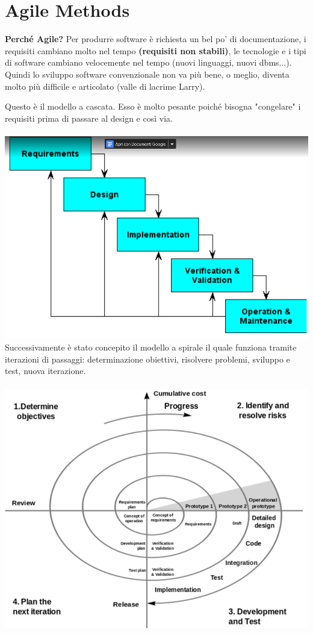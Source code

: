 \documentclass[10pt,a4paper]{book}
\begin{document}
\section{Agile Methods}
\textbf{Perché Agile?} Per produrre software è richiesta un bel po' di documentazione, i requisiti cambiano molto nel tempo \textbf{(requisiti non stabili)}, le tecnologie e i tipi di software cambiano velocemente nel tempo (nuovi linguaggi, nuovi dbms...). Quindi lo sviluppo software convenzionale non va più bene, o meglio, diventa molto più difficile e articolato (valle di lacrime Larry).

Questo è il modello a cascata. Esso è molto pesante poiché bisogna "congelare" i requisiti prima di passare al design e così via.\\\\
\includegraphics[scale=0.2]{waterfall.png}\\

Successivamente è stato concepito il modello a spirale il quale funziona tramite iterazioni di passaggi: determinazione obiettivi, risolvere problemi, sviluppo e test, nuova iterazione.\\\\
\includegraphics[scale=0.2]{spiral.png}\\
\end{document}
